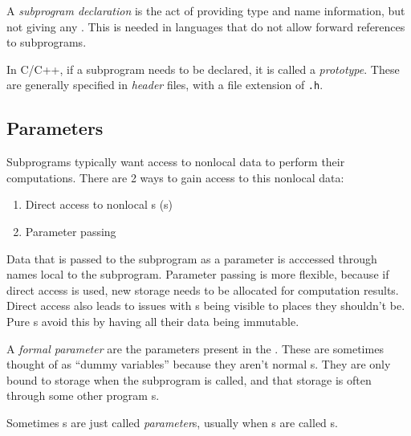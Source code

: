 \begin{definition}\label{def:Subprogram_Declaration}
  A \emph{subprogram declaration} is the act of providing type and name information, but not giving any .
  This is needed in languages that do not allow forward references to subprograms.

  \begin{remark}[Prototype]\label{rmk:Subprogram_Prototype}
    In C/C++, if a subprogram needs to be declared, it is called a \emph{prototype}.
    These are generally specified in \emph{header} files, with a file extension of \texttt{.h}.
  \end{remark}
\end{definition}

\subsection{Parameters}\label{subsec:Subprogram_Parameters}
Subprograms typically want access to nonlocal data to perform their computations.
There are 2 ways to gain access to this nonlocal data:
\begin{enumerate}[noitemsep]
\item Direct access to nonlocal s (s)
\item Parameter passing
\end{enumerate}

Data that is passed to the subprogram as a parameter is acccessed through names local to the subprogram.
Parameter passing is more flexible, because if direct access is used, new storage needs to be allocated for computation results.
Direct access also leads to issues with s being visible to places they shouldn't be.
Pure s avoid this by having all their data being immutable.

\begin{definition}\label{def:Formal_Parameter}
  A \emph{formal parameter} are the parameters present in the .
  These are sometimes thought of as ``dummy variables'' because they aren't normal s.
  They are only bound to storage when the subprogram is called, and that storage is often through some other program s.

  \begin{remark}[Parameter]\label{rmk:Parameter}
    Sometimes s are just called \emph{parameter}s, usually when s are called s.
  \end{remark}
\end{definition}

